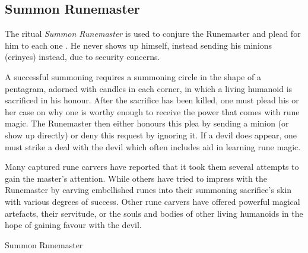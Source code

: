 \subsection{Summon Runemaster}
\label{sec:Summon Runemaster}

The ritual \emph{Summon Runemaster} is used to conjure the Runemaster and plead
for him to each one . He never shows up himself, instead
sending his minions (erinyes) instead, due to security concerns.

A successful summoning requires a summoning circle in the shape of a
pentagram, adorned with candles in each corner, in which a living humanoid is
sacrificed in his honour. After the sacrifice has been killed, one must plead
his or her case on why one is worthy enough to receive the power that comes
with rune magic. The Runemaster then either honours this plea by sending a
minion (or show up directly) or deny this request by ignoring it.  If a devil
does appear, one must strike a deal with the devil which often includes aid in
learning rune magic.

Many captured rune carvers have reported that it took them several attempts to
gain the master's attention. While others have tried to impress with the
Runemaster by carving embellished runes into their summoning sacrifice's skin
with various degrees of success. Other rune carvers have offered powerful
magical artefacts, their servitude, or the souls and bodies of other living
humanoids in the hope of gaining favour with the devil.

\begin{35e}{Summon Runemaster}
\end{35e}
